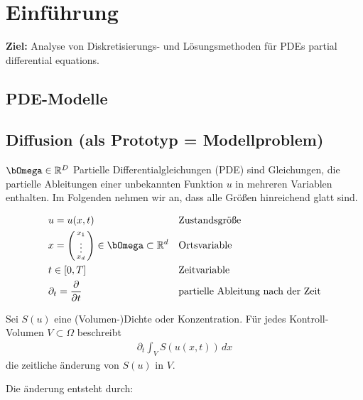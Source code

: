 \section{Einführung}

\textbf{Ziel:} Analyse von Diskretisierungs- und Lösungsmethoden für PDEs partial differential equations.

\subsection{PDE-Modelle}

\subsection{Diffusion (als Prototyp = Modellproblem)}
$\Omega \in \R^D$
Partielle Differentialgleichungen (PDE) sind Gleichungen, die partielle
Ableitungen einer unbekannten Funktion $u$ in mehreren Variablen enthalten.
Im Folgenden nehmen wir an, dass alle Grö\ss en hinreichend glatt sind.


\begin{Bezeichnung}
    \begin{align*}
        &u = u(x,t)     && \text{Zustandsgrö\ss e} \\
        &x = \left(\begin{smallmatrix}
                x_1 \\
                \vdots \\
                x_d
              \end{smallmatrix}\right)\in\Omega\subset\R^d
                        && \text{Ortsvariable} \\
        &t\in [0,T]	    && \text{Zeitvariable} \\
        &\partial_t = \frac{\partial}{\partial t}
                        && \text{partielle Ableitung nach der Zeit}
    \end{align*}
\end{Bezeichnung}


Sei $S(u)$ eine (Volumen-)Dichte oder Konzentration.
Für jedes Kontroll-Volumen $V\subset\Omega$ beschreibt
\begin{eqnarray*}
     \partial_t \int_{V} S(u(x, t))\,dx
\end{eqnarray*}
die zeitliche änderung von $S(u)$ in $V$.


Die änderung entsteht durch:


